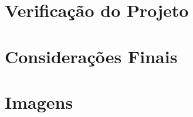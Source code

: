 \documentclass[]{politex}
\begin{document}
\chapter{Verificação do Projeto}


\chapter{Considerações Finais}


\appendix
\chapter{Imagens}



%




\end{document}
